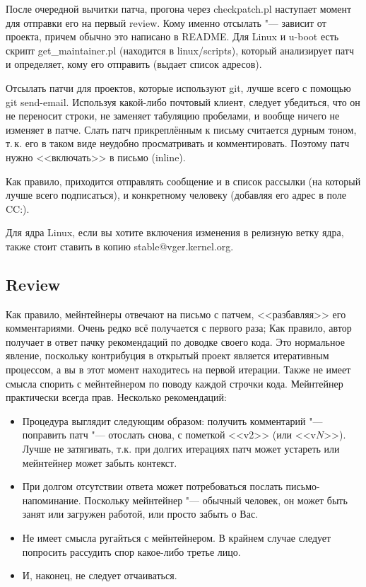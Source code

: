 \documentclass[10pt, a5paper]{article}
\begin{document}
После очередной вычитки патча, прогона через checkpatch.pl наступает момент для отправки его на первый review. Кому именно отсылать "--- зависит от проекта, причем обычно это написано в README. Для Linux и u-boot есть скрипт get\_maintainer.pl (находится в linux/scripts), который анализирует патч и определяет, кому его отправить (выдает список адресов).

Отсылать патчи для проектов, которые используют git, лучше всего с помощью git send-email. Используя какой-либо почтовый клиент, следует убедиться, что он не переносит строки, не заменяет табуляцию пробелами, и вообще ничего не изменяет в патче. Слать патч прикреплённым к письму считается дурным тоном, т.\,к. его в таком виде неудобно просматривать и комментировать. Поэтому патч нужно <<включать>> в письмо (inline).

Как правило, приходится отправлять сообщение и в список рассылки (на который лучше всего подписаться), и конкретному человеку (добавляя его адрес в поле CC:).

Для ядра Linux, если вы хотите включения изменения в релизную ветку ядра, также стоит ставить в копию stable@vger.kernel.org.

\subsection*{Review}

Как правило, мейнтейнеры отвечают на письмо с патчем, <<разбавляя>> его комментариями. Очень редко всё получается с первого раза; Как правило, автор получает в ответ пачку рекомендаций по доводке своего кода. Это нормальное явление, поскольку контрибуция в открытый проект является итеративным процессом, а вы в этот момент находитесь на первой итерации. Также не имеет смысла спорить с мейнтейнером по поводу каждой строчки кода. Мейнтейнер практически всегда прав. Несколько рекомендаций:

\begin{itemize}
    \item Процедура выглядит следующим образом: получить комментарий "--- поправить патч "--- отослать снова, с пометкой <<v2>> (или <<v$N$>>). Лучше не затягивать, т.к. при долгих итерациях патч может устареть или мейнтейнер может забыть контекст.
    \item При долгом отсутствии ответа может потребоваться послать письмо-напоминание. Поскольку мейнтейнер "--- обычный человек, он может быть занят или загружен работой, или просто забыть о Вас.
    \item Не имеет смысла ругайться с мейнтейнером. В крайнем случае следует попросить рассудить спор какое-либо третье лицо.
    \item И, наконец, не следует отчаиваться.
\end{itemize}
\end{document}
